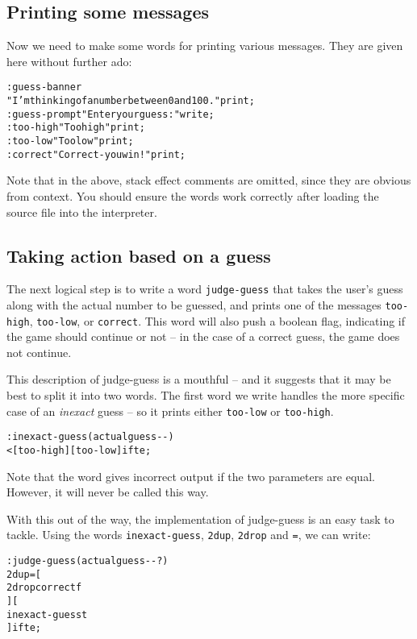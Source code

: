 \documentclass[english]{article}
\begin{document}
\subsection{Printing some messages}

Now we need to make some words for printing various messages. They
are given here without further ado:

\begin{alltt}
: guess-banner
    "I'm thinking of a number between 0 and 100." print ;
: guess-prompt "Enter your guess: " write ;
: too-high "Too high" print ;
: too-low "Too low" print ;
: correct "Correct - you win!" print ;
\end{alltt}
Note that in the above, stack effect comments are omitted, since they
are obvious from context. You should ensure the words work correctly
after loading the source file into the interpreter.


\subsection{Taking action based on a guess}

The next logical step is to write a word \texttt{judge-guess} that
takes the user's guess along with the actual number to be guessed,
and prints one of the messages \texttt{too-high}, \texttt{too-low},
or \texttt{correct}. This word will also push a boolean flag, indicating
if the game should continue or not -- in the case of a correct guess,
the game does not continue.

This description of judge-guess is a mouthful -- and it suggests that
it may be best to split it into two words. The first word we write
handles the more specific case of an \emph{inexact} guess -- so it
prints either \texttt{too-low} or \texttt{too-high}.

\begin{alltt}
: inexact-guess ( actual guess -{}- )
     < {[} too-high {]} {[} too-low {]} ifte ;
\end{alltt}
Note that the word gives incorrect output if the two parameters are
equal. However, it will never be called this way.

With this out of the way, the implementation of judge-guess is an
easy task to tackle. Using the words \texttt{inexact-guess}, \texttt{2dup}, \texttt{2drop} and \texttt{=}, we can write:

\begin{alltt}
: judge-guess ( actual guess -{}- ? )
    2dup = {[}
        2drop correct f
    {]} {[}
        inexact-guess t
    {]} ifte ;
\end{alltt}
\end{document}
